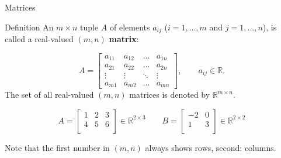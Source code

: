 \documentclass{beamer}
\newcommand{\R}{\mathbb{R}}
\begin{document}





\begin{frame}{Matrices}
\begin{block}{Definition}
An \(m \times n\) tuple $A$ of elements \(a_{ij}\) ($i = 1, \ldots, m$ and $j = 1, \ldots, n$), is called a real-valued \((m, n)\) \textbf{matrix}:

\[
A =
\begin{bmatrix}
    a_{11} & a_{12} & \ldots & a_{1n} \\
    a_{21} & a_{22} & \ldots & a_{2n} \\
    \vdots & \vdots & \ddots & \vdots \\
    a_{m1} & a_{m2} & \ldots & a_{mn}
\end{bmatrix},
\qquad a_{ij} \in \mathbb{R}.
\]
The set of all real-valued $(m,n)$ matrices is denoted by $\R^{m\times n}$. 
\end{block} 

  \begin{example}
    \[
      A = \begin{bmatrix}
        1 & 2 & 3 \\
        4 & 5 & 6 \\
      \end{bmatrix} \in \R^{2\times 3}
      \qquad
      B = \begin{bmatrix}
        -2 & 0 \\
        1 & 3 \\
      \end{bmatrix} \in \R^{2\times 2}
    \]
  \end{example}
\pause Note that the first number in $(m,n)$ \alert{always} shows rows, second: columns.
\end{frame}
\end{document}
